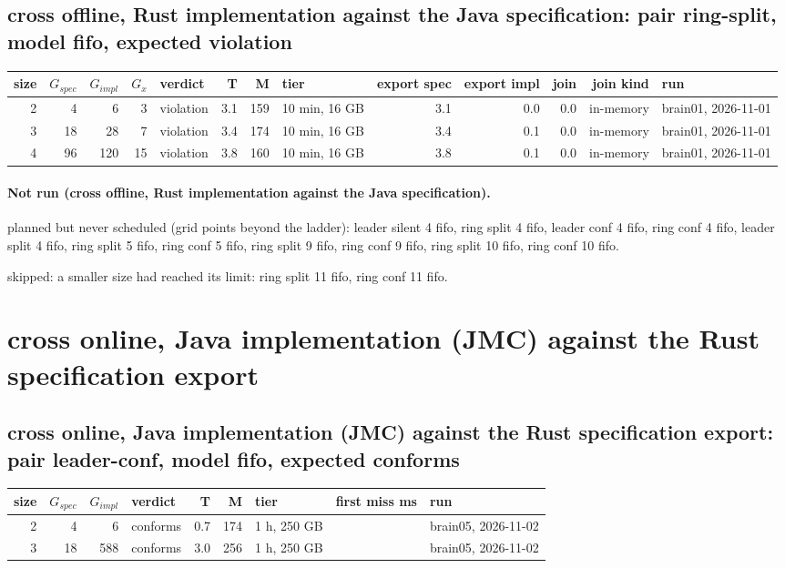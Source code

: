 \documentclass[10pt]{article}
\begin{document}
\subsection*{cross offline, Rust implementation against the Java specification: pair \textsf{ring-split}, model fifo, expected violation}
\begin{longtable}{@{}rrrrlrrlrrrrl@{}}
\toprule
size & $G_{\mathit{spec}}$ & $G_{\mathit{impl}}$ & $G_x$ & verdict & T & M & tier & export spec & export impl & join & join kind & run \\
\midrule
\endhead
\color{red} 2 & 4 & 6 & 3 & violation & 3.1 & 159 & 10 min, 16 GB & 3.1 & 0.0 & 0.0 & in-memory & brain01, 2026-11-01 \\
\color{red} 3 & 18 & 28 & 7 & violation & 3.4 & 174 & 10 min, 16 GB & 3.4 & 0.1 & 0.0 & in-memory & brain01, 2026-11-01 \\
\color{red} 4 & 96 & 120 & 15 & violation & 3.8 & 160 & 10 min, 16 GB & 3.8 & 0.1 & 0.0 & in-memory & brain01, 2026-11-01 \\
\bottomrule
\end{longtable}
\paragraph{Not run (cross offline, Rust implementation against the Java specification).}
planned but never scheduled (grid points beyond the ladder): leader silent 4 fifo, ring split 4 fifo, leader conf 4 fifo, ring conf 4 fifo, leader split 4 fifo, ring split 5 fifo, ring conf 5 fifo, ring split 9 fifo, ring conf 9 fifo, ring split 10 fifo, ring conf 10 fifo.\par
skipped: a smaller size had reached its limit: ring split 11 fifo, ring conf 11 fifo.\par
\section*{cross online, Java implementation (JMC) against the Rust specification export}
\subsection*{cross online, Java implementation (JMC) against the Rust specification export: pair \textsf{leader-conf}, model fifo, expected conforms}
\begin{longtable}{@{}rrrlrrlrl@{}}
\toprule
size & $G_{\mathit{spec}}$ & $G_{\mathit{impl}}$ & verdict & T & M & tier & first miss ms & run \\
\midrule
\endhead
\color{red} 2 & 4 & 6 & conforms & 0.7 & 174 & 1 h, 250 GB &  & brain05, 2026-11-02 \\
\color{red} 3 & 18 & 588 & conforms & 3.0 & 256 & 1 h, 250 GB &  & brain05, 2026-11-02 \\
\bottomrule
\end{longtable}
\end{document}
